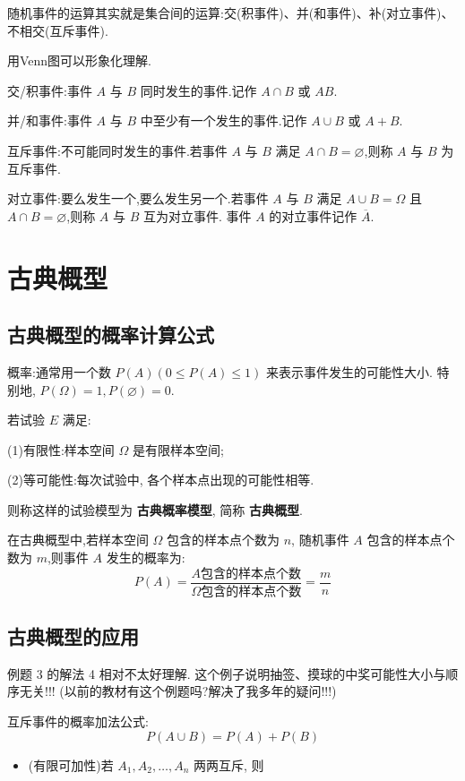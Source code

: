 \documentclass[titlepage]{ctexart}
\begin{document}
随机事件的运算其实就是集合间的运算:交(积事件)、并(和事件)、补(对立事件)、不相交(互斥事件).

用Venn图可以形象化理解.

交/积事件:事件 $A$ 与 $B$ 同时发生的事件.记作 $A \cap B$ 或 $AB$.

并/和事件:事件 $A$ 与 $B$ 中至少有一个发生的事件.记作 $A \cup B $ 或 $A + B$.

互斥事件:不可能同时发生的事件.若事件 $A$ 与 $B$ 满足 $A \cap B = \varnothing$,则称 $A$ 与 $B$ 为互斥事件.

对立事件:要么发生一个,要么发生另一个.若事件 $A$ 与 $B$ 满足 $A \cup B = \varOmega$ 且 $A \cap B = \varnothing$,则称 $A$ 与 $B$ 互为对立事件.
事件 $A$ 的对立事件记作 $\overline{A}$.


\section{古典概型}

\subsection{古典概型的概率计算公式}

概率:通常用一个数 $P(A)(0 \leqslant P(A) \leqslant 1)$ 来表示事件发生的可能性大小.
特别地, $P(\varOmega) = 1, P(\varnothing) = 0$.

若试验 $E$ 满足:

(1)有限性:样本空间 $\varOmega$ 是有限样本空间;

(2)等可能性:每次试验中, 各个样本点出现的可能性相等.

则称这样的试验模型为 \textbf{古典概率模型}, 简称 \textbf{古典概型}.

在古典概型中,若样本空间 $\varOmega$ 包含的样本点个数为 $n$, 随机事件 $A$ 包含的样本点个数为 $m$,则事件 $A$ 发生的概率为:
\[
P(A) = \frac
    {A\text{包含的样本点个数}}
    {\varOmega \text{包含的样本点个数}}
     = \frac{m}{n}
\]

\subsection{古典概型的应用}

例题 3 的解法 4 相对不太好理解. 这个例子说明抽签、摸球的中奖可能性大小与顺序无关!!! (以前的教材有这个例题吗?解决了我多年的疑问!!!)

互斥事件的概率加法公式:
\[
P(A \cup B) = P(A) + P(B)
\]

\begin{itemize}
    \item (有限可加性)若 $A_{1}, A_{2}, \dots, A_{n}$ 两两互斥, 则
\end{itemize}
\end{document}
